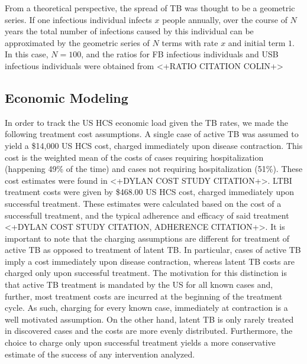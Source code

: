 \documentclass{amsart}
\begin{document}
From a theoretical perspective, the spread of TB was thought to be a geometric
series. If one infectious individual infects $x$ people annually, over the
course of $N$ years the total number of infections caused by this individual can
be approximated by the geometric series of $N$ terms with rate $x$ and initial
term $1$. In this case, $N = 100$, and the ratios for FB infectious individuals
and USB infectious individuals were obtained from <+RATIO CITATION COLIN+>
\subsection{Economic Modeling}
In order to track the US HCS economic load given the TB rates, we made the
following treatment cost assumptions. A single case of active TB was assumed to
yield a \$14,000 US HCS cost, charged immediately upon disease contraction. This
cost is the weighted mean of the costs of cases requiring hospitalization
(happening 49\% of the time) and cases not requiring hospitalization (51\%).
These cost estimates were found in <+DYLAN COST STUDY CITATION+>. LTBI treatment
costs were given by \$468.00 US HCS cost, charged immediately upon successful
treatment. These estimates were calculated based on the cost of a successfull
treatment, and the typical adherence and efficacy of said treatment <+DYLAN COST
STUDY CITATION, ADHERENCE CITATION+>. It is important to note that the charging
assumptions are different for treatment of active TB as opposed to treatment of
latent TB. In particular, cases of active TB imply a cost immediately upon
disease contraction, whereas latent TB costs are charged only upon successful
treatment. The motivation for this distinction is that active TB treatment is
mandated by the US for all known cases and, further, most treatment costs are
incurred at the beginning of the treatment cycle. As such, charging for every
known case, immediately at contraction is a well motivated assumption. On the
other hand, latent TB is only rarely treated in discovered cases and the costs
are more evenly distributed. Furthermore, the choice to charge only upon
successful treatment yields a more conservative estimate of the success of any
intervention analyzed. 
\end{document}
